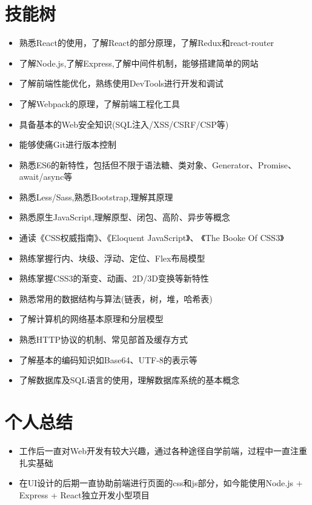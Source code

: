 \documentclass{resume}
\begin{document}
\section{技能树}
\begin{itemize}
  \item 熟悉React的使用，了解React的部分原理，了解Redux和react-router
  \item 了解Node.js,了解Express,了解中间件机制，能够搭建简单的网站
  \item 了解前端性能优化，熟练使用DevTools进行开发和调试
  \item 了解Webpack的原理，了解前端工程化工具
  \item 具备基本的Web安全知识(SQL注入/XSS/CSRF/CSP等)
  \item 能够使痛Git进行版本控制
\end{itemize}
\begin{itemize}
  \item 熟悉ES6的新特性，包括但不限于语法糖、类对象、Generator、Promise、await/async等
  \item 熟悉Less/Sass,熟悉Bootstrap,理解其原理
  \item 熟悉原生JavaScript,理解原型、闭包、高阶、异步等概念
  \item 通读《CSS权威指南》、《Eloquent JavaScript》、 《The Booke Of CSS3》
  \item 熟练掌握行内、块级、浮动、定位、Flex布局模型
  \item 熟练掌握CSS3的渐变、动画、2D/3D变换等新特性
\end{itemize}
\begin{itemize}
  \item 熟悉常用的数据结构与算法(链表，树，堆，哈希表)
  \item 了解计算机的网络基本原理和分层模型
  \item 熟悉HTTP协议的机制、常见部首及缓存方式
  \item 了解基本的编码知识如Base64、UTF-8的表示等
  \item 了解数据库及SQL语言的使用，理解数据库系统的基本概念
\end{itemize}


\section{个人总结}
  \begin{itemize}
    \item 工作后一直对Web开发有较大兴趣，通过各种途径自学前端，过程中一直注重扎实基础
    \item 在UI设计的后期一直协助前端进行页面的css和js部分，如今能使用Node.js + Express + React独立开发小型项目
  \end{itemize}
\end{document}
